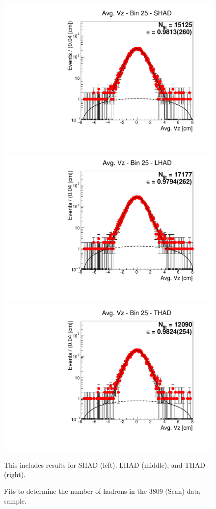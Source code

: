 \begin{figure}[H]
\centering
\includegraphics[scale=0.25]{figures/plots/nonDDbar_fit_results/scan/fit_scan_25_data_SHAD.pdf}
\hspace{-0.5cm}
\includegraphics[scale=0.25]{figures/plots/nonDDbar_fit_results/scan/fit_scan_25_data_LHAD.pdf}
\hspace{-0.5cm}
\includegraphics[scale=0.25]{figures/plots/nonDDbar_fit_results/scan/fit_scan_25_data_THAD.pdf}
\caption{Fits to determine the number of hadrons in the 3809 (Scan) data sample.}
{This includes results for SHAD (left), LHAD (middle), and THAD (right).}
\label{fig:hadron_fits_scan_25}
\end{figure}

